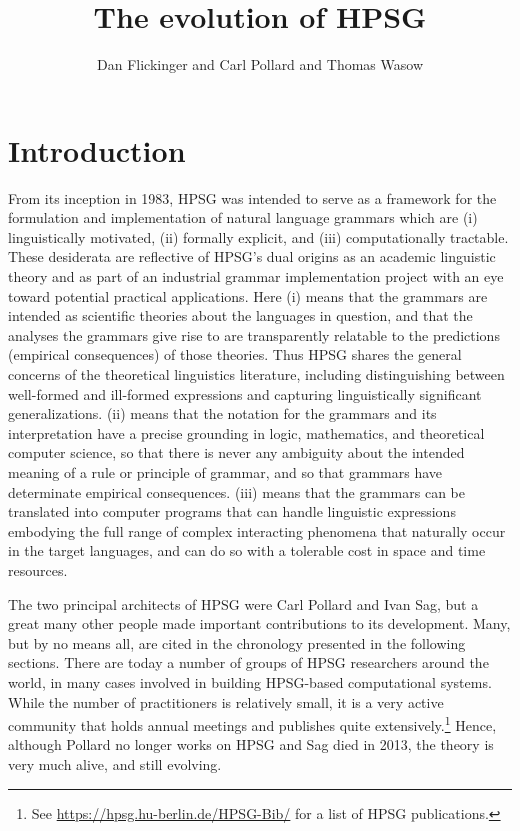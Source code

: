 \documentclass[output=paper,biblatex,babelshorthands,newtxmath,draftmode,colorlinks,citecolor=brown]{langscibook}
\title{The evolution of HPSG}
\author{Dan Flickinger\orcid{000-0001-7959-999X}\affiliation{Stanford University} and Carl Pollard\affiliation{Ohio State
    Universitiy} and Thomas Wasow\affiliation{Stanford University}}
\begin{document}
\maketitle
\label{chap-evolution}


\section{Introduction} 

From its inception in 1983, HPSG was intended to serve as a framework for the formulation and implementation of natural language grammars which are (i) linguistically motivated, (ii) formally explicit, and (iii) computationally tractable. These desiderata are reflective of HPSG's dual origins as an academic linguistic theory and as part of an industrial grammar implementation project with an eye toward potential practical applications. Here (i) means that the grammars are intended as scientific theories about the languages in question, and that the analyses the grammars give rise to are transparently relatable to the predictions (empirical consequences) of those theories. Thus HPSG shares the general concerns of the theoretical linguistics literature, including distinguishing between well-formed and ill-formed expressions and capturing linguistically significant generalizations.  (ii) means that the notation for the grammars and its interpretation have a precise grounding in logic, mathematics, and theoretical computer science, so that there is never any ambiguity about the intended meaning of a rule or principle of grammar, and so that grammars have determinate empirical consequences. (iii) means that the grammars can be translated into computer programs that can handle linguistic expressions embodying the full range of complex interacting phenomena that naturally occur in the target languages, and can do so with a tolerable cost in space and time resources.

The two principal architects of HPSG were Carl Pollard and Ivan
Sag, but a great many other people made important contributions to its
development.  Many, but by no means all, are cited in the chronology presented in the following
sections.  There are today a number of groups of HPSG researchers around the world, in many cases
involved in building HPSG-based computational systems.  While the number of practitioners is
relatively small, it is a very active community that holds annual meetings and publishes quite
extensively.\footnote{See \url{https://hpsg.hu-berlin.de/HPSG-Bib/} for a list of HPSG
    publications.} Hence, although Pollard no longer works on HPSG and Sag died in 2013, the theory
is very much alive, and still evolving.
\end{document}
